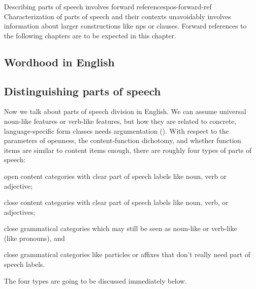 \documentclass[UTF8, a4paper, oneside, scheme=plain]{ctexrep}
\begin{document}
\begin{learnbox}{Describing parts of speech involves forward references}{pos-forward-ref}
    Characterization of parts of speech and their contexts unavoidably involves 
    information about larger constructions like \acs{np}s or clauses.
    Forward references to the following chapters are to be expected in this chapter.
\end{learnbox}

\subsection{Wordhood in English}


\subsection{Distinguishing parts of speech}

Now we talk about parts of speech division in English.
We can assume universal noun-like features or verb-like features,
but how they are related to concrete, language-specific form classes needs argumentation 
().
With respect to the parameters of 
openness, the content-function dichotomy,
and whether function items are similar to content items enough,
there are roughly four types of parts of speech:
\begin{enumerate*}
    \item open content categories with clear part of speech labels like noun, verb or adjective;
    \item close content categories with clear part of speech labels like noun, verb, or adjectives;
    \item close grammatical categories which may still be seen as noun-like or verb-like (like pronouns), and 
    \item close grammatical categories like particles or affixes that don't really need part of speech labels.
\end{enumerate*}
The four types are going to be discussed immediately below.
\end{document}
